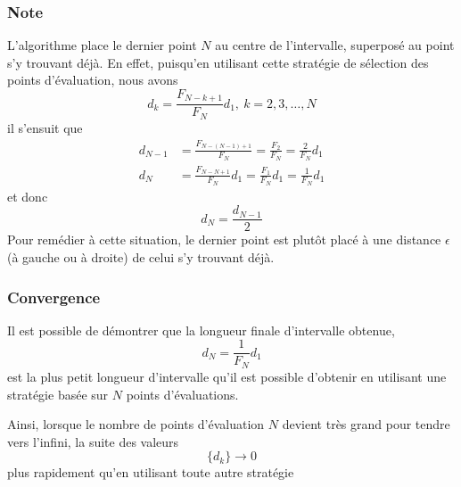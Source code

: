 \documentclass[usepdftitle=false]{beamer}
\begin{document}



\begin{frame}
\frametitle{Note}

L'algorithme place le dernier point $N$ au centre de l'intervalle, superposé au point s’y trouvant déjà.
En effet, puisqu'en utilisant cette stratégie de sélection des points d'évaluation, nous avons
$$
d_k = \frac{F_{N-k+1}}{F_N}d_1,\ k = 2, 3,\ldots, N
$$
il s'ensuit que
\begin{align*}
d_{N-1} &= \frac{F_{N-(N-1)+1}}{F_N} = \frac{F_2}{F_N} = \frac{2}{F_N}d_1 \\
d_N &= \frac{F_{N-N+1}}{F_N}d_1 = \frac{F_1}{F_N}d_1 = \frac{1}{F_N}d_1 
\end{align*}
et donc
$$
d_N = \frac{d_{N-1}}{2}
$$
Pour remédier à cette situation, le dernier point est plutôt placé à une distance $\epsilon$ (à gauche ou à droite) de celui s'y trouvant déjà.
\end{frame}

\begin{frame}
\frametitle{Convergence}

Il est possible de démontrer que la longueur finale d'intervalle obtenue,
\[
d_N = \frac{1}{F_N}d_1 
\]
est la plus petit longueur d'intervalle qu’il est possible d’obtenir en utilisant
une stratégie basée sur $N$ points d’évaluations.

\mbox{}

Ainsi, lorsque le nombre de points d'évaluation $N$ devient très grand
pour tendre vers l’infini, la suite des valeurs
$$
\{ d_k \} \rightarrow 0
$$
plus rapidement qu’en utilisant toute autre stratégie

\end{frame}
\end{document}
